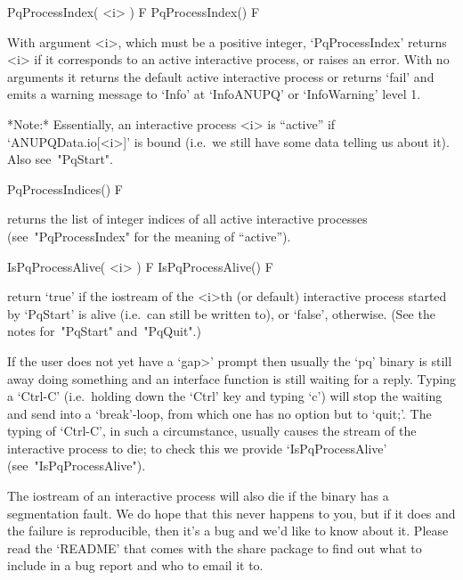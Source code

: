 \>PqProcessIndex( <i> ) F
\>PqProcessIndex() F

With argument <i>, which must be  a  positive  integer,  `PqProcessIndex'
returns <i> if it corresponds to an active interactive process, or raises
an error. With no arguments it returns  the  default  active  interactive
process or returns `fail' and  emits  a  warning  message  to  `Info'  at
`InfoANUPQ' or `InfoWarning' level 1.

*Note:*
Essentially,  an  interactive  {\ANUPQ}  process  <i>  is  ``active''  if
`ANUPQData.io[<i>]' is bound (i.e.~we still have  some  data  telling  us
about it). Also see~"PqStart".

\>PqProcessIndices() F

returns the list of integer indices of all  active  interactive  {\ANUPQ}
processes (see~"PqProcessIndex" for the meaning of ``active'').

\>IsPqProcessAlive( <i> ) F
\>IsPqProcessAlive() F

return  `true'  if  the  {\GAP}  iostream  of  the  <i>th  (or   default)
interactive {\ANUPQ} process started  by  `PqStart'  is  alive  (i.e.~can
still be written to), or `false', otherwise. (See the notes for~"PqStart"
and~"PqQuit".)

If the user does not yet have a  `gap>'  prompt  then  usually  the  `pq'
binary is still away doing something and an {\ANUPQ}  interface  function
is still waiting for a reply. Typing a `Ctrl-C'  (i.e.~holding  down  the
`Ctrl' key and typing `c') will stop the waiting and send {\GAP}  into  a
`break'-loop, from which one has no option but to `quit;'. The typing  of
`Ctrl-C', in such a  circumstance,  usually  causes  the  stream  of  the
interactive  {\ANUPQ}  process  to  die;  to  check   this   we   provide
`IsPqProcessAlive' (see~"IsPqProcessAlive").

The {\GAP} iostream of an interactive {\ANUPQ} process will also  die  if
the {\ANUPQ} binary has a segmentation fault. We do hope that this  never
happens to you, but if it does and the failure is reproducible, then it's
a bug and we'd like to know about it. Please read the `README' that comes
with the {\ANUPQ} share package to find out what  to  include  in  a  bug
report and who to email it to.


